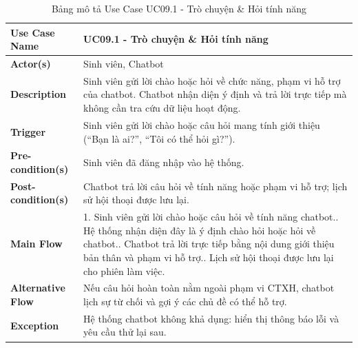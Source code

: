 \begin{table}[H]
	\centering
	\renewcommand{\arraystretch}{1.25}
	\begin{tabular}{|p{3.8cm}|p{11.2cm}|}
		\hline
		\textbf{Use Case Name} & \textbf{UC09.1 - Trò chuyện \& Hỏi tính năng} \\ \hline
		\textbf{Actor(s)} & Sinh viên, Chatbot \\ \hline
		\textbf{Description} & Sinh viên gửi lời chào hoặc hỏi về chức năng, phạm vi hỗ trợ của chatbot. Chatbot nhận diện ý định và trả lời trực tiếp mà không cần tra cứu dữ liệu hoạt động. \\ \hline
		\textbf{Trigger} & Sinh viên gửi lời chào hoặc câu hỏi mang tính giới thiệu (``Bạn là ai?'', ``Tôi có thể hỏi gì?''). \\ \hline
		\textbf{Pre-condition(s)} & Sinh viên đã đăng nhập vào hệ thống. \\ \hline
		\textbf{Post-condition(s)} & Chatbot trả lời câu hỏi về tính năng hoặc phạm vi hỗ trợ; lịch sử hội thoại được lưu lại. \\ \hline
		\textbf{Main Flow} &
		1. Sinh viên gửi lời chào hoặc câu hỏi về tính năng chatbot.\newline
		2. Hệ thống nhận diện đây là ý định chào hỏi hoặc hỏi về chatbot.\newline
		3. Chatbot trả lời trực tiếp bằng nội dung giới thiệu bản thân và phạm vi hỗ trợ.\newline
		4. Lịch sử hội thoại được lưu lại cho phiên làm việc. \\ \hline
		\textbf{Alternative Flow} & Nếu câu hỏi hoàn toàn nằm ngoài phạm vi CTXH, chatbot lịch sự từ chối và gợi ý các chủ đề có thể hỗ trợ. \\ \hline
		\textbf{Exception} & Hệ thống chatbot không khả dụng: hiển thị thông báo lỗi và yêu cầu thử lại sau. \\ \hline
	\end{tabular}
	\caption{Bảng mô tả Use Case UC09.1 - Trò chuyện \& Hỏi tính năng}
\end{table}

